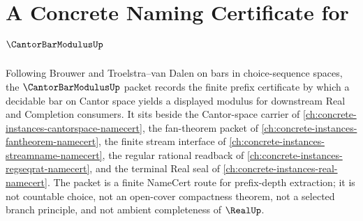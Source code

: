 \chapter{A Concrete Naming Certificate for $\CantorBarModulusUp$}
\label{ch:concrete-instances-cantor-bar-modulus-namecert}

Following Brouwer and Troelstra--van Dalen on bars in choice-sequence spaces, the $\CantorBarModulusUp$ packet records the finite prefix certificate by which a decidable bar on Cantor space yields a displayed modulus for downstream Real and Completion consumers. It sits beside the Cantor-space carrier of \autoref{ch:concrete-instances-cantorspace-namecert}, the fan-theorem packet of \autoref{ch:concrete-instances-fantheorem-namecert}, the finite stream interface of \autoref{ch:concrete-instances-streamname-namecert}, the regular rational readback of \autoref{ch:concrete-instances-regseqrat-namecert}, and the terminal Real seal of \autoref{ch:concrete-instances-real-namecert}. The packet is a finite NameCert route for prefix-depth extraction; it is not countable choice, not an open-cover compactness theorem, not a selected branch principle, and not ambient completeness of $\RealUp$.

